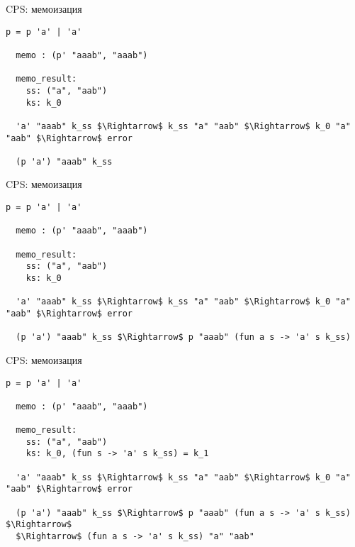 \documentclass[10pt, mathserif]{beamer}
\theoremstyle{definition}
\begin{document}
\begin{frame}[fragile]{CPS: мемоизация}

\begin{lstlisting}[basicstyle=\small]
  p = p 'a' | 'a'

  memo : (p' "aaab", "aaab")

  memo_result:
    ss: ("a", "aab")
    ks: k_0

  'a' "aaab" k_ss $\Rightarrow$ k_ss "a" "aab" $\Rightarrow$ k_0 "a" "aab" $\Rightarrow$ error

  (p 'a') "aaab" k_ss
\end{lstlisting}

\end{frame}

\begin{frame}[fragile]{CPS: мемоизация}

\begin{lstlisting}[basicstyle=\small]
  p = p 'a' | 'a'

  memo : (p' "aaab", "aaab")

  memo_result:
    ss: ("a", "aab")
    ks: k_0

  'a' "aaab" k_ss $\Rightarrow$ k_ss "a" "aab" $\Rightarrow$ k_0 "a" "aab" $\Rightarrow$ error

  (p 'a') "aaab" k_ss $\Rightarrow$ p "aaab" (fun a s -> 'a' s k_ss)
\end{lstlisting}

\end{frame}

\begin{frame}[fragile]{CPS: мемоизация}

\begin{lstlisting}[basicstyle=\small]
  p = p 'a' | 'a'

  memo : (p' "aaab", "aaab")

  memo_result:
    ss: ("a", "aab")
    ks: k_0, (fun s -> 'a' s k_ss) = k_1

  'a' "aaab" k_ss $\Rightarrow$ k_ss "a" "aab" $\Rightarrow$ k_0 "a" "aab" $\Rightarrow$ error

  (p 'a') "aaab" k_ss $\Rightarrow$ p "aaab" (fun a s -> 'a' s k_ss) $\Rightarrow$
  $\Rightarrow$ (fun a s -> 'a' s k_ss) "a" "aab"
\end{lstlisting}

\end{frame}
\end{document}
